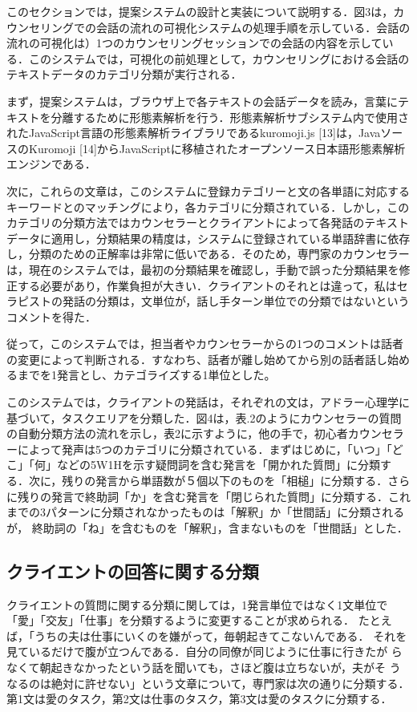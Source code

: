 \documentclass[shuuron]{kuee}
\begin{document}
このセクションでは，提案システムの設計と実装について説明する．図3は，カウンセリングでの会話の流れの可視化システムの処理手順を示している．会話の流れの可視化は）1つのカウンセリングセッションでの会話の内容を示している．このシステムでは，可視化の前処理として，カウンセリングにおける会話のテキストデータのカテゴリ分類が実行される．


まず，提案システムは，ブラウザ上で各テキストの会話データを読み，言葉にテキストを分離するために形態素解析を行う．形態素解析サブシステム内で使用されたJavaScript言語の形態素解析ライブラリであるkuromoji.js [13]は，JavaソースのKuromoji [14]からJavaScriptに移植されたオープンソース日本語形態素解析エンジンである．

次に，これらの文章は，このシステムに登録カテゴリーと文の各単語に対応するキーワードとのマッチングにより，各カテゴリに分類されている．しかし，このカテゴリの分類方法ではカウンセラーとクライアントによって各発話のテキストデータに適用し，分類結果の精度は，システムに登録されている単語辞書に依存し，分類のための正解率は非常に低いである．そのため，専門家のカウンセラーは，現在のシステムでは，最初の分類結果を確認し，手動で誤った分類結果を修正する必要があり，作業負担が大きい．クライアントのそれとは違って，私はセラピストの発話の分類は，文単位が，話し手ターン単位での分類ではないというコメントを得た．


従って，このシステムでは，担当者やカウンセラーからの1つのコメントは話者の変更によって判断される．すなわち、話者が離し始めてから別の話者話し始めるまでを1発言とし、カテゴライズする1単位とした。

このシステムでは，クライアントの発話は，それぞれの文は，アドラー心理学に基づいて，タスクエリアを分類した．図4は，表.2のようにカウンセラーの質問の自動分類方法の流れを示し，表2に示すように，他の手で，初心者カウンセラーによって発声は5つのカテゴリに分類されている．まずはじめに，「いつ」「どこ」「何」などの5W1Hを示す疑問詞を含む発言を「開かれた質問」に分類する．次に，残りの発言から単語数が５個以下のものを「相槌」に分類する．さらに残りの発言で終助詞「か」を含む発言を「閉じられた質問」に分類する．これまでの3パターンに分類されなかったものは「解釈」か「世間話」に分類されるが，
終助詞の「ね」を含むものを「解釈」，含まないものを「世間話」とした．


\subsection{クライエントの回答に関する分類} %


クライエントの質問に関する分類に関しては，1発言単位ではなく1文単位で「愛」「交友」「仕事」を分類するように変更することが求められる．
たとえば，「うちの夫は仕事にいくのを嫌がって，毎朝起きてこないんである．
それを見ているだけで腹が立つんである．自分の同僚が同じように仕事に行きたが
らなくて朝起きなかったという話を聞いても，さほど腹は立ちないが，夫がそ
うなるのは絶対に許せない」という文章について，専門家は次の通りに分類する．第1文は愛のタスク，第2文は仕事のタスク，第3文は愛のタスクに分類する．
\end{document}
